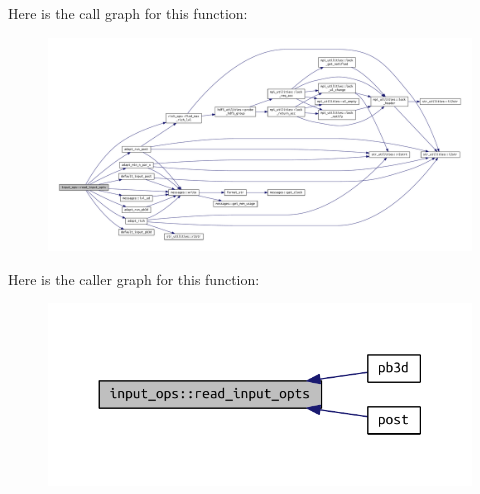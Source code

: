 Here is the call graph for this function\+:
\nopagebreak
\begin{figure}[H]
\begin{center}
\leavevmode
\includegraphics[width=350pt]{namespaceinput__ops_a434acca4f59f9dc1d91e04f846133684_cgraph}
\end{center}
\end{figure}
Here is the caller graph for this function\+:
\nopagebreak
\begin{figure}[H]
\begin{center}
\leavevmode
\includegraphics[width=330pt]{namespaceinput__ops_a434acca4f59f9dc1d91e04f846133684_icgraph}
\end{center}
\end{figure}
